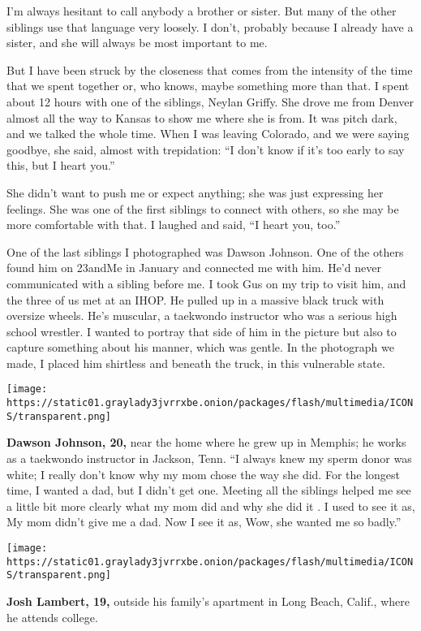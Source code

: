 I'm always hesitant to call anybody a brother or sister. But many of the
other siblings use that language very loosely. I don't, probably because
I already have a sister, and she will always be most important to me.

But I have been struck by the closeness that comes from the intensity of
the time that we spent together or, who knows, maybe something more than
that. I spent about 12 hours with one of the siblings, Neylan Griffy.
She drove me from Denver almost all the way to Kansas to show me where
she is from. It was pitch dark, and we talked the whole time. When I was
leaving Colorado, and we were saying goodbye, she said, almost with
trepidation: ``I don't know if it's too early to say this, but I heart
you.''

She didn't want to push me or expect anything; she was just expressing
her feelings. She was one of the first siblings to connect with others,
so she may be more comfortable with that. I laughed and said, ``I heart
you, too.''

One of the last siblings I photographed was Dawson Johnson. One of the
others found him on 23andMe in January and connected me with him. He'd
never communicated with a sibling before me. I took Gus on my trip to
visit him, and the three of us met at an IHOP. He pulled up in a massive
black truck with oversize wheels. He's muscular, a taekwondo instructor
who was a serious high school wrestler. I wanted to portray that side of
him in the picture but also to capture something about his manner, which
was gentle. In the photograph we made, I placed him shirtless and
beneath the truck, in this vulnerable state.

\texttt{[image: https://static01.graylady3jvrrxbe.onion/packages/flash/multimedia/ICONS/transparent.png]}

\textbf{Dawson Johnson, 20,} near the home where he grew up in Memphis;
he works as a taekwondo instructor in Jackson, Tenn. ``I always knew my
sperm donor was white; I really don't know why my mom chose the way she
did. For the longest time, I wanted a dad, but I didn't get one. Meeting
all the siblings helped me see a little bit more clearly what my mom did
and why she did it . I used to see it as, My mom didn't give me a dad.
Now I see it as, Wow, she wanted me so badly.''

\texttt{[image: https://static01.graylady3jvrrxbe.onion/packages/flash/multimedia/ICONS/transparent.png]}

\textbf{Josh Lambert, 19,} outside his family's apartment in Long Beach,
Calif., where he attends college.

